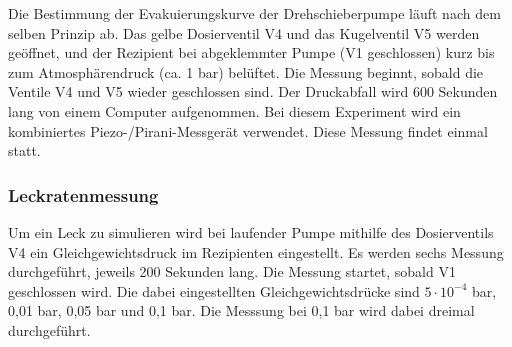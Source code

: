 Die Bestimmung der Evakuierungskurve der Drehschieberpumpe läuft nach dem selben Prinzip ab. Das gelbe Dosierventil V4 und das Kugelventil V5 werden geöffnet,
und der Rezipient bei abgeklemmter Pumpe (V1 geschlossen) kurz bis zum Atmosphärendruck (ca. 1 bar) belüftet. Die Messung beginnt, sobald die Ventile V4 und V5 wieder geschlossen
sind. Der Druckabfall wird 600 Sekunden lang von einem Computer aufgenommen. Bei diesem Experiment wird ein kombiniertes Piezo-/Pirani-Messgerät
verwendet. Diese Messung findet einmal statt.

\subsubsection{Leckratenmessung}
Um ein Leck zu simulieren wird bei laufender Pumpe mithilfe des Dosierventils V4 ein Gleichgewichtsdruck im Rezipienten eingestellt.
Es werden sechs Messung durchgeführt, jeweils 200 Sekunden lang. Die Messung startet, sobald V1 geschlossen wird. Die dabei eingestellten 
Gleichgewichtsdrücke sind $5\cdot 10^{-4}$ bar, 0,01 bar, 0,05 bar und 0,1 bar. Die Messsung bei 0,1 bar wird dabei dreimal durchgeführt.